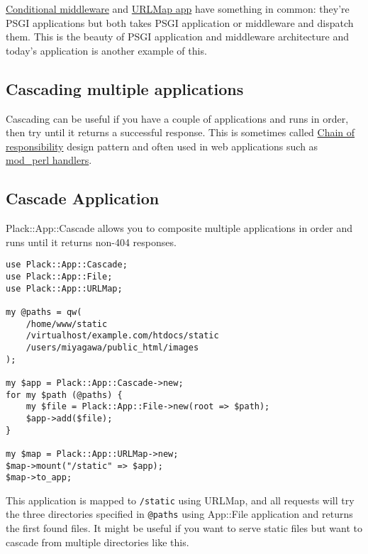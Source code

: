 \href{http://advent.plackperl.org/2009/12/day-18-load-middleware-conditionally.html}{Conditional
middleware} and
\href{http://advent.plackperl.org/2009/12/day-12-maps-multiple-apps-with-mount-and-urlmap.html}{URLMap
app} have something in common: they're PSGI applications but both takes
PSGI application or middleware and dispatch them. This is the beauty of
PSGI application and middleware architecture and today's application is
another example of this.

\subsection{Cascading multiple
applications}\label{cascading-multiple-applications}

Cascading can be useful if you have a couple of applications and runs in
order, then try until it returns a successful response. This is
sometimes called
\href{http://en.wikipedia.org/wiki/Chain-of-responsibility_pattern}{Chain
of responsibility} design pattern and often used in web applications
such as
\href{http://perl.apache.org/docs/2.0/user/handlers/intro.html}{mod\_perl
handlers}.

\subsection{Cascade Application}\label{cascade-application}

Plack::App::Cascade allows you to composite multiple applications in
order and runs until it returns non-404 responses.

\begin{lstlisting}
use Plack::App::Cascade;
use Plack::App::File;
use Plack::App::URLMap;

my @paths = qw(
    /home/www/static
    /virtualhost/example.com/htdocs/static
    /users/miyagawa/public_html/images
);

my $app = Plack::App::Cascade->new;
for my $path (@paths) {
    my $file = Plack::App::File->new(root => $path);
    $app->add($file);
}

my $map = Plack::App::URLMap->new;
$map->mount("/static" => $app);
$map->to_app;
\end{lstlisting}

This application is mapped to \lstinline!/static! using URLMap, and all
requests will try the three directories specified in \lstinline!@paths!
using App::File application and returns the first found files. It might
be useful if you want to serve static files but want to cascade from
multiple directories like this.

